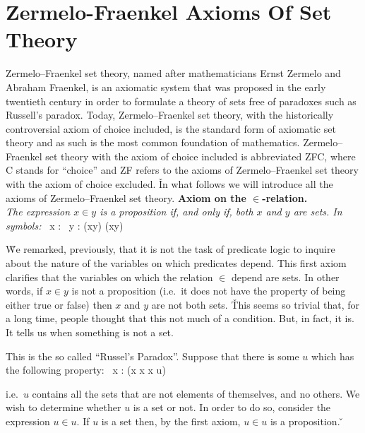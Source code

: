 \section{Zermelo-Fraenkel Axioms Of Set Theory}

Zermelo–Fraenkel set theory, named after mathematicians Ernst Zermelo and Abraham Fraenkel, is an axiomatic system
that was proposed in the early twentieth century in order to formulate a theory of sets free of paradoxes such as
Russell's paradox. Today, Zermelo–Fraenkel set theory, with the historically controversial axiom of choice included,
is the standard form of axiomatic set theory and as such is the most common foundation of mathematics.
Zermelo–Fraenkel set theory with the axiom of choice included is abbreviated ZFC, where C stands for ``choice'' and
ZF refers to the axioms of Zermelo–Fraenkel set theory with the axiom of choice excluded. \v

In what follows we will introduce all the axioms of Zermelo–Fraenkel set theory. \v

\textbf{Axiom on the $\in$-relation.}\index{$\in$} \\
\emph{The expression $x\in y$ is a proposition if, and only if, both $x$ and $y$ are sets. In symbols:}
\bse
\forall \, x : \forall \, y : (x\in y) \veebar \neg (x\in y)
\ese

\v

We remarked, previously, that it is not the task of predicate logic to inquire about the nature of the variables on
which predicates depend. This first axiom clarifies that the variables on which the relation $\in$ depend are sets.
In other words, if $x\in y$ is not a proposition (i.e.\ it does not have the property of being either true or false)
then $x$ and $y$ are not both sets. \v

This seems so trivial that, for a long time, people thought that this not much of a condition. But, in fact, it is.
It tells us when something is not a set.

\be
This is the so called ``Russel's Paradox''. Suppose that there is some $u$ which has the following property:
\bse
\forall \, x : (x \notin x \eqv x \in u)
\ese

i.e.\ $u$ contains all the sets that are not elements of themselves, and no others. We wish to determine whether $u$
is a set or not. In order to do so, consider the expression $u\in u$. If $u$ is a set then, by the first axiom, $u\in
u$ is a proposition. \v


